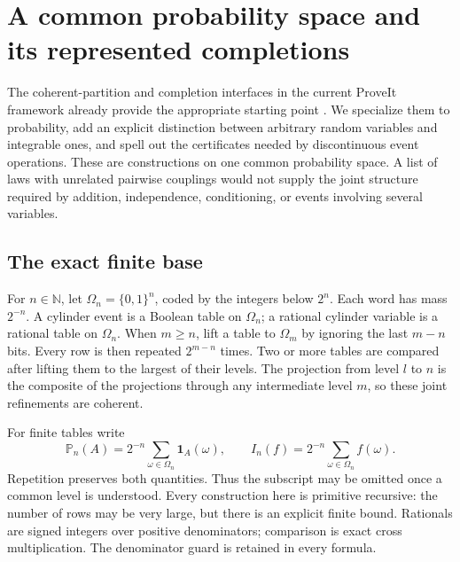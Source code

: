 \section{A common probability space and its represented completions}
\label{sec:prob-foundation}

The coherent-partition and completion interfaces in the current ProveIt
framework already provide the appropriate starting point
\cite{repoObservable,repoMeasureTransport}. We specialize them to probability,
add an explicit distinction between arbitrary random variables and integrable
ones, and spell out the certificates needed by discontinuous event operations.
These are constructions on one common probability space. A list of laws with
unrelated pairwise couplings would not supply the joint structure required by
addition, independence, conditioning, or events involving several variables.

\subsection{The exact finite base}

For $n\in\mathbb N$, let $\Omega_n=\{0,1\}^n$, coded by the integers below
$2^n$. Each word has mass $2^{-n}$. A cylinder event is a Boolean table on
$\Omega_n$; a rational cylinder variable is a rational table on $\Omega_n$.
When $m\ge n$, lift a table to $\Omega_m$ by ignoring the last $m-n$ bits.
Every row is then repeated $2^{m-n}$ times. Two or more tables are compared
after lifting them to the largest of their levels. The projection from level
$l$ to $n$ is the composite of the projections through any intermediate
level $m$, so these joint refinements are coherent.

For finite tables write
\[
 \mathbb P_n(A)=2^{-n}\sum_{\omega\in\Omega_n}\mathbf1_A(\omega),
 \qquad I_n(f)=2^{-n}\sum_{\omega\in\Omega_n}f(\omega).
\]
Repetition preserves both quantities. Thus the subscript may be omitted once
a common level is understood. Every construction here is primitive recursive:
the number of rows may be very large, but there is an explicit finite bound.
Rationals are signed integers over positive denominators; comparison is exact
cross multiplication. The denominator guard is retained in every formula.

